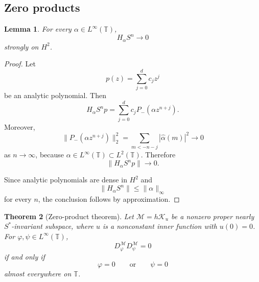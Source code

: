 \documentclass[12pt]{amsart}
\newtheorem{theorem}{Theorem}[section]
\newtheorem{lemma}[theorem]{Lemma}
\theoremstyle{definition}
\theoremstyle{remark}
\def \T{\mathbb{T}}
\newcommand{\clm}{\mathcal{M}}
\newcommand{\clk}{\mathcal{K}}
\newcommand{\vp}{\varphi}
\numberwithin{equation}{section}
\begin{document}
\subsection{Zero products}
\begin{lemma}\label{lem:hankel-shift-vanishing}
For every $\alpha\in L^\infty(\T)$,
\[
H_\alpha S^n\longrightarrow0
\]
strongly on $H^2$.
\end{lemma}

\begin{proof}
Let
\[
p(z)=\sum_{j=0}^{d}c_jz^j
\]
be an analytic polynomial. Then
\[
H_\alpha S^np
=
\sum_{j=0}^{d}c_jP_-(\alpha z^{n+j}).
\]
Moreover,
\[
\|P_-(\alpha z^{n+j})\|_2^2
=
\sum_{m<-n-j}|\widehat\alpha(m)|^2
\longrightarrow0
\]
as $n\to\infty$, because $\alpha\in L^\infty(\T)\subset L^2(\T)$.
Therefore
\[
\|H_\alpha S^np\|\longrightarrow0.
\]

Since analytic polynomials are dense in $H^2$ and
\[
\|H_\alpha S^n\|\leq\|\alpha\|_\infty
\]
for every $n$, the conclusion follows by approximation.
\end{proof}

\begin{theorem}[Zero-product theorem]
\label{thm:zero-product}
Let $\clm=h\clk_u$ be a nonzero proper nearly $S^*$-invariant
subspace, where $u$ is a nonconstant inner function with $u(0)=0$.
For $\vp,\psi\in L^\infty(\T)$,
\[
D_\vp^\clm D_\psi^\clm=0
\]
if and only if
\[
\vp=0
\qquad\text{or}\qquad
\psi=0
\]
almost everywhere on $\T$.
\end{theorem}
\end{document}
